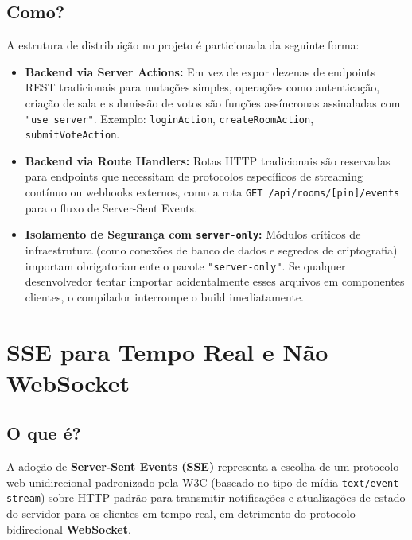 \documentclass[12pt,a4paper]{article}
\begin{document}
\subsection{Como?}
A estrutura de distribuição no projeto é particionada da seguinte forma:
\begin{itemize}
  \item \textbf{Backend via Server Actions:} Em vez de expor dezenas de endpoints REST tradicionais para mutações simples, operações como autenticação, criação de sala e submissão de votos são funções assíncronas assinaladas com \texttt{"use server"}. Exemplo: \texttt{loginAction}, \texttt{createRoomAction}, \texttt{submitVoteAction}.
  \item \textbf{Backend via Route Handlers:} Rotas HTTP tradicionais são reservadas para endpoints que necessitam de protocolos específicos de streaming contínuo ou webhooks externos, como a rota \texttt{GET /api/rooms/[pin]/events} para o fluxo de Server-Sent Events.
  \item \textbf{Isolamento de Segurança com \texttt{server-only}:} Módulos críticos de infraestrutura (como conexões de banco de dados e segredos de criptografia) importam obrigatoriamente o pacote \texttt{"server-only"}. Se qualquer desenvolvedor tentar importar acidentalmente esses arquivos em componentes clientes, o compilador interrompe o build imediatamente.
\end{itemize}

\section{SSE para Tempo Real e Não WebSocket}

\subsection{O que é?}
A adoção de \textbf{Server-Sent Events (SSE)} representa a escolha de um protocolo web unidirecional padronizado pela W3C (baseado no tipo de mídia \texttt{text/event-stream}) sobre HTTP padrão para transmitir notificações e atualizações de estado do servidor para os clientes em tempo real, em detrimento do protocolo bidirecional \textbf{WebSocket}.
\end{document}
